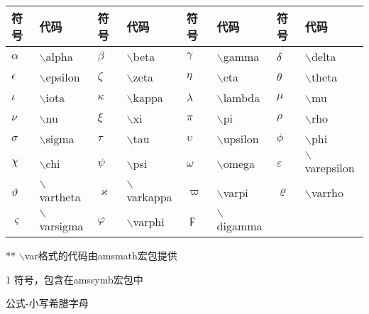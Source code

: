 \documentclass[UTF8,fontset=ubuntu]{ctexart}
\begin{document}
\begin{threeparttable}
\begin{tabular}{l l l l l l l l}
	\hline
	符号 & 代码 & 符号 & 代码 & 符号 & 代码 & 符号 & 代码\\
	\hline
	$\alpha$ & $\backslash$alpha & $\beta$ & $\backslash$beta & $\gamma$ & $\backslash$gamma & $\delta$ & $\backslash$delta\\
	$\epsilon$ & $\backslash$epsilon & $\zeta$ & $\backslash$zeta & $\eta$ & $\backslash$eta & $\theta$ & $\backslash$theta\\
	$\iota$ & $\backslash$iota & $\kappa$ & $\backslash$kappa & $\lambda$ & $\backslash$lambda & $\mu$ & $\backslash$mu\\
	$\nu$ & $\backslash$nu & $\xi$ & $\backslash$xi & $\pi$ & $\backslash$pi & $\rho$ & $\backslash$rho\\
	$\sigma$ & $\backslash$sigma & $\tau$ & $\backslash$tau & $\upsilon$ & $\backslash$upsilon & $\phi$ & $\backslash$phi\\
	$\chi$ & $\backslash$chi & $\psi$ & $\backslash$psi & $\omega$ & $\backslash$omega & $\varepsilon$ & $\backslash$varepsilon\\
	$\vartheta$ & $\backslash$vartheta & $\varkappa$ & $\backslash$varkappa\tnote{1} & $\varpi$ & $\backslash$varpi & $\varrho$ & $\backslash$varrho\tnote{1}\\
	$\varsigma$ & $\backslash$varsigma & $\varphi$ & $\backslash$varphi & $\digamma$ & $\backslash$digamma\tnote{1}\\
	\hline
\end{tabular}
** $\backslash$var格式的代码由amsmath宏包提供
\begin{tablenotes}
	\item[1] \AMS 符号，包含在amssymb宏包中
\end{tablenotes}
\caption{公式-小写希腊字母}
\end{threeparttable}
\end{document}
